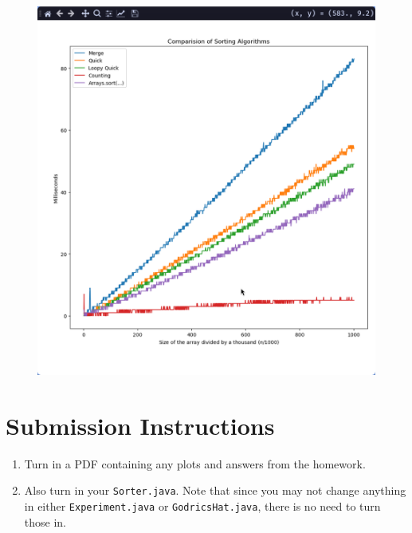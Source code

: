 \documentclass{homework}
\begin{document}
\begin{figure}
  \includegraphics[width=\linewidth]{Screenshot_19-Sep_10-03-32_matplotlib.png}
\end{figure}


\section*{Submission Instructions}

\begin{enumerate}
  \item Turn in a PDF containing any plots and answers from the homework.
  \item Also turn in your \texttt{Sorter.java}. Note that since you may
        not change anything in either \texttt{Experiment.java} or
        \texttt{GodricsHat.java}, there is no need to turn those in.
\end{enumerate}
\end{document}
